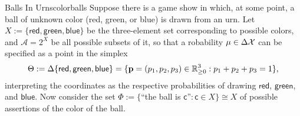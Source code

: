 \documentclass{article}
\begin{document}
\begin{examplex}{Balls In Urns}{colorballs}
    \def\red{{\mathsf{red}}}
    \def\green{{\mathsf{green}}}
    \def\blue{{\mathsf{blue}}}
Suppose there is a game show in which, at some point, a ball of unknown color
(red, green, or blue) is drawn from an urn.
Let  $X := \{ \red,\green,\blue \}$ be the three-element set corresponding to possible colors,
 and $\mathcal A = 2^X$ be all possible subsets of it, so that a robability $\mu \in \Delta \mathcal X$
can be specified as a
point in the simplex
$$\Theta
:= \Delta \{ \red,\green,\blue \}
= \{\mat p = (p_1, p_2, p_3)  \in \mathbb R^3_{\ge 0} : p_1 + p_2 + p_3 = 1\},$$
interpreting
the coordinates as the respective probabilities of drawing $\red$, $\green$, and $\blue$.
%
Now consider the set
 $\Phi := \{$``the ball is $\mathsf c$''$ : \mathsf c \in X\} \cong X$ of possible assertions of the color of the ball.


\end{examplex}
\end{document}
